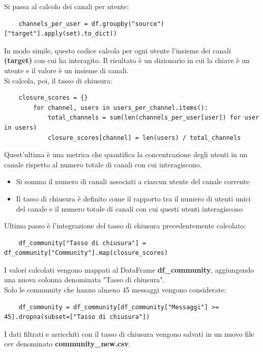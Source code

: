 \documentclass[12pt]{article}
\begin{document}
	Si passa al calcolo dei canali per utente:
	\begin{lstlisting}
	channels_per_user = df.groupby("source")["target"].apply(set).to_dict()
	\end{lstlisting}
	In modo simile, questo codice calcola per ogni utente l'insieme dei canali \textbf{(target)} con cui ha interagito. Il risultato è un dizionario in cui la chiave è un utente e il valore è un insieme di canali.\\
	Si calcola, poi, il tasso di chiusura:
	\begin{lstlisting}
	closure_scores = {}
		for channel, users in users_per_channel.items():
			total_channels = sum(len(channels_per_user[user]) for user in users)
			closure_scores[channel] = len(users) / total_channels
	\end{lstlisting}
	Quest'ultima è una metrica che quantifica la concentrazione degli utenti in un canale rispetto al numero totale di canali con cui interagiscono.
	\begin{itemize}[label=]
		\item Si somma il numero di canali associati a ciascun utente del canale corrente
		\item Il tasso di chiusura è definito come il rapporto tra il numero di utenti unici del canale e il numero totale di canali con cui questi utenti interagiscono
	\end{itemize}
	Ultimo passo è l'integrazione del tasso di chiusura precedentemente calcolato:
	\begin{lstlisting}
	df_community["Tasso di chiusura"] = df_community["Community"].map(closure_scores)
	\end{lstlisting}
	I valori calcolati vengono mappati al DataFrame \textbf{df\_community}, aggiungendo una nuova colonna denominata "Tasso di chiusura".\\
	Solo le community che hanno almeno 45 messaggi vengono considerate:
	\begin{lstlisting}
	df_community = df_community[df_community["Messaggi"] >= 45].dropna(subset=["Tasso di chiusura"])
	\end{lstlisting}
	I dati filtrati e arricchiti con il tasso di chiusura vengono salvati in un nuovo file csv denominato \textbf{community\_new.csv}.
	\newpage
\end{document}
